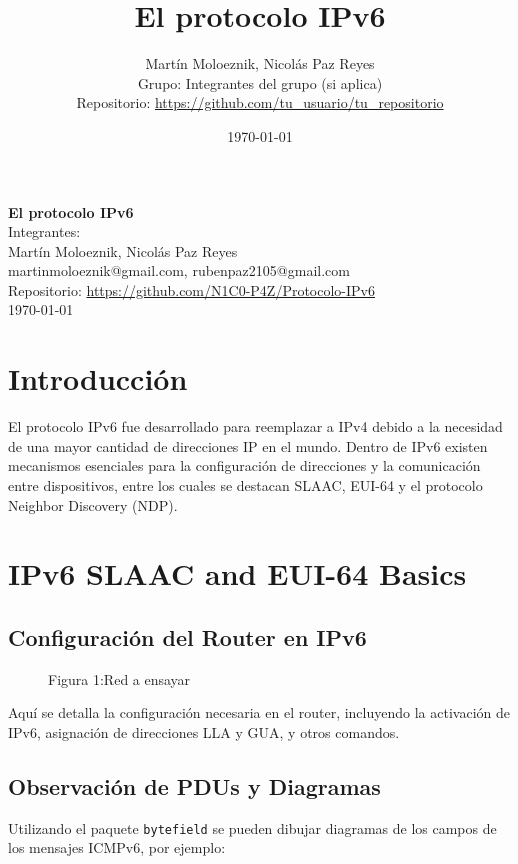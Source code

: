 \documentclass[a4paper,12pt]{article}
\title{El protocolo IPv6}
\author{Martín Moloeznik, Nicolás Paz Reyes\\[0.5em]
Grupo: Integrantes del grupo (si aplica)\\[0.5em]
Repositorio: \url{https://github.com/tu_usuario/tu_repositorio}}
\date{\today}
\begin{document}
\begin{titlepage}
  \centering
  \vspace*{2cm}
  {\large \textbf{El protocolo IPv6}}\\[1.5cm]
  
  {\large Integrantes:}\\
   \bigskip
  {\large Martín Moloeznik, Nicolás Paz Reyes} \\[0.5cm]
  {\large {martinmoloeznik@gmail.com}, {rubenpaz2105@gmail.com}} \\[0.5cm]
  \bigskip
  {\large Repositorio: \url{https://github.com/N1C0-P4Z/Protocolo-IPv6}}\\[1cm]
  
  \vfill
  {\large \today}
\end{titlepage}

\tableofcontents
\newpage

\section{Introducción}
El protocolo IPv6 fue desarrollado para reemplazar a IPv4 debido a la necesidad de una mayor cantidad de direcciones IP en el mundo. Dentro de IPv6 existen mecanismos esenciales para la configuración de direcciones y la comunicación entre dispositivos, entre los cuales se destacan SLAAC, EUI-64 y el protocolo Neighbor Discovery (NDP).

\section{IPv6 SLAAC and EUI-64 Basics}
\subsection{Configuración del Router en IPv6}
\begin{figure}[H]
  \centering
  \caption{Figura 1:Red a ensayar}
  \label{fig:github-imagen}
\end{figure}

Aquí se detalla la configuración necesaria en el router, incluyendo la activación de IPv6, asignación de direcciones LLA y GUA, y otros comandos.

\subsection{Observación de PDUs y Diagramas}
Utilizando el paquete \texttt{bytefield} se pueden dibujar diagramas de los campos de los mensajes ICMPv6, por ejemplo: \\
\end{document}
